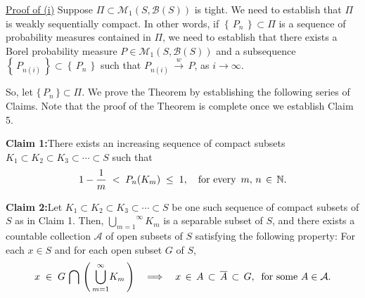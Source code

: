 \vskip 0.3cm
\noindent
\underline{Proof of (i)}
\vskip 0.2cm
\noindent
Suppose $\Pi \subset \mathcal{M}_{1}(S,\mathcal{B}(S))$ is tight.
We need to establish that $\Pi$ is weakly sequentially compact.
In other words, if $\left\{\,P_{n}\,\right\} \subset \Pi$ is a sequence of probability measures contained in $\Pi$,
we need to establish that there exists a Borel probability measure
$P \in \mathcal{M}_{1}(S,\mathcal{B}(S))$ and a subsequence
$\left\{\,P_{n(i)}\,\right\} \subset \left\{\,P_{n}\,\right\}$
such that $P_{n(i)}\,\overset{w}{\longrightarrow}\,P$, as $i \longrightarrow \infty$.

\vskip 0.5cm
\noindent
So, let $\{\,P_{n}\,\} \subset \Pi$.
We prove the Theorem by establishing the following series of Claims.
Note that the proof of the Theorem is complete once we establish Claim 5.

\vskip 0.5cm
\begin{center}
\begin{minipage}{6.5in}
\textbf{Claim 1:}\quad There exists an increasing sequence of compact subsets
$K_{1} \subset K_{2} \subset K_{3} \subset \cdots \subset S$ such that
\begin{equation*}
1 - \dfrac{1}{m} \; < \; P_{n}(K_{m}) \; \leq \; 1,
\quad
\textnormal{for every \,$m, \,n \,\in\, \mathbb{N}$}.
\end{equation*}
\end{minipage}
\end{center}

\vskip 0.5cm
\begin{center}
\begin{minipage}{6.5in}
\textbf{Claim 2:}\quad Let  $K_{1} \subset K_{2} \subset K_{3} \subset \cdots \subset S$
be one such sequence of compact subsets of $S$ as in Claim 1.
Then, $\overset{\infty}{\underset{m=1}{\bigcup}}K_{m}$ is a separable subset of $S$, and
there exists a countable collection $\mathcal{A}$ of open subsets of $S$ satisfying the
following property:
For each $x \in S$ and for each open subset $G$ of $S$,
\begin{equation*}
x \; \in \; G\,\bigcap\,\left(\,\overset{\infty}{\underset{m=1}{\bigcup}}K_{m}\,\right)
\quad
\Longrightarrow
\quad
x \,\in\, A \,\subset\, \overline{A} \,\subset\, G,
\;\;\textnormal{for some $A \in \mathcal{A}$}.
\end{equation*} 
\end{minipage}
\end{center}

